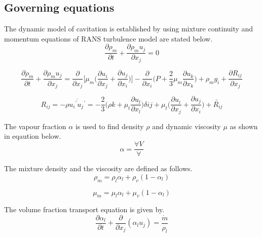 \subsection{Governing equations}
The dynamic model of cavitation is established by using mixture
continuity and momentum equations of RANS turbulence model are stated
below\cite{Zhao2021}.
\begin{equation}
\frac{\partial{{\rho}_m}}{\partial t} + \frac{\partial{{{\rho}_m}
    u_j}}{\partial{x_j}} = 0
\end{equation}

\begin{equation}
\frac{\partial{{\rho}_m}}{\partial t} + \frac{\partial{{{\rho}_m}
    u_j}}{\partial{x_j}}
=\frac{\partial}{\partial{x_j}}\Bigg[{\mu}_m\Bigg(\frac{\partial{u_i}}{\partial{x_j}}+\frac{\partial{u_j}}{\partial{x_i}}\Bigg)\Bigg]
-\frac{\partial}{\partial{x_i}} \Bigg({P}+{\frac{2}{3}}{\mu}_m
\frac{\partial{u_k}}{\partial{x_k}}\Bigg) + {{\rho}_m}g_i
+\frac{\partial{R_{ij}}}{\partial{x_j}}
\end{equation}

\begin{equation}
R_{ij} = {- \rho \overline{{{u_i}^\prime}{{u_j}^\prime}}} = -
\frac{2}{3}\Bigg({\rho}k
+{{\mu}_t}\frac{\partial{u_l}}{\partial{x_l}}\Bigg)\delta{ij} +
{{\mu}_t}\Bigg({{\frac{\partial{u_i}}{\partial{x_j}}}
  +\frac{\partial{u_j}}{\partial{x_i}}}\Bigg) + {\tilde{R_{ij}}}
\end{equation}

The vapour fraction $\alpha$ is used to find density $\rho$ and
dynamic viscosity $\mu$ as shown in eqaution below.
\begin{equation}
\alpha =\frac {\forall{V}}{\forall}
\end{equation}

The mixture density and the viscosity are defined as follows.
\begin{equation}
{{\rho}_m} = {{\rho}_l}{{\alpha}_l} + {{\rho}_v}(1-{{\alpha}_l})
\end{equation}

\begin{equation}
{{\mu}_m} = {{\mu}_l}{{\alpha}_l} +{{\mu}_v}(1-{{\alpha}_l})
\end{equation}

The volume fraction transport equation is given by.
\begin{equation}
\frac{\partial{\alpha}_l}{\partial t}+\frac{\partial}{\partial{x_j}}
({{\alpha}_l}{u_j}) = \frac{\dot{m}}{{\rho}_l}
\end{equation}

